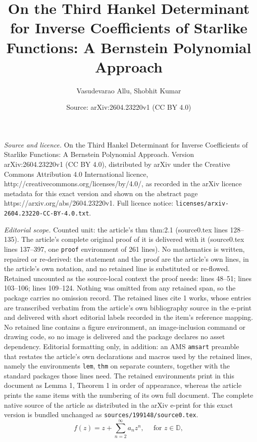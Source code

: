 \documentclass[10pt,a4paper]{amsart}
\title{On the Third Hankel Determinant for Inverse Coefficients of Starlike Functions: A Bernstein Polynomial Approach}
\author{Vasudevarao Allu, Shobhit Kumar}
\date{Source: arXiv:2604.23220v1 (CC BY 4.0)}
\begin{document}
\maketitle

\noindent\emph{Source and licence.} On the Third Hankel Determinant for Inverse Coefficients of Starlike Functions: A Bernstein Polynomial Approach. Version arXiv:2604.23220v1 (CC BY 4.0), distributed by arXiv under the Creative Commons Attribution 4.0 International licence, http://creativecommons.org/licenses/by/4.0/, as recorded in the arXiv licence metadata for this exact version and shown on the abstract page https://arxiv.org/abs/2604.23220v1. Full licence notice: \texttt{licenses/arxiv-2604.23220-CC-BY-4.0.txt}.\par\smallskip

\noindent\textit{Editorial scope.} Counted unit: the article's thm thm:2.1 (source0.tex lines 128--135). The article's complete original proof of it is delivered with it (source0.tex lines 137--397, one \texttt{proof} environment of 261 lines). No mathematics is written, repaired or re-derived: the statement and the proof are the article's own lines, in the article's own notation, and no retained line is substituted or re-flowed.  Retained uncounted as the source-local context the proof needs: lines 48--51; lines 103--106; lines 109--124.  Nothing was omitted from any retained span, so the package carries no omission record.  The retained lines cite 1 works, whose entries are transcribed verbatim from the article's own bibliography source in the e-print and delivered with short editorial labels recorded in the item's reference mapping.  No retained line contains a figure environment, an image-inclusion command or drawing code, so no image is delivered and the package declares no asset dependency.  Editorial formatting only, in addition: an AMS \texttt{amsart} preamble that restates the article's own declarations and macros used by the retained lines, namely the environments \texttt{lem}, \texttt{thm} on separate counters, together with the standard packages those lines need.  The retained environments print in this document as Lemma 1, Theorem 1 in order of appearance, whereas the article prints the same items with the numbering of its own full document.  The complete native source of the article as distributed in the arXiv e-print for this exact version is bundled unchanged as \texttt{sources/199148/source0.tex}.
\begin{equation}
	\label{eq:1.1}
	f(z)=z+\sum_{n=2}^{\infty}a_n z^n,\quad \text{ for } z\in\mathbb{D},
\end{equation}
\end{document}
